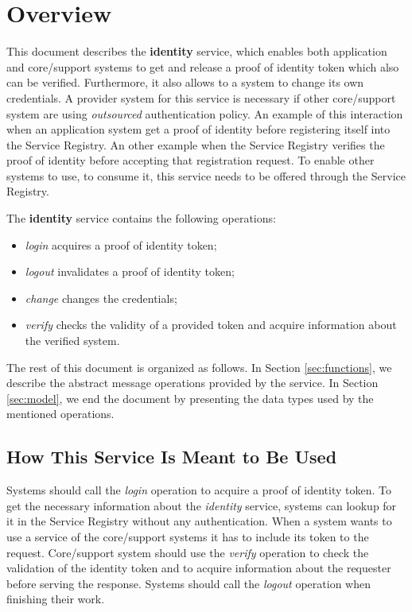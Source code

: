 \documentclass[a4paper]{arrowhead}
\begin{document}
\section{Overview}
\label{sec:overview}
This document describes the \textbf{identity} service, which enables both application and core/support systems to get and release a proof of identity token which also can be verified. Furthermore, it also allows to a system to change its own credentials. A provider system for this service is necessary if other core/support system are using \textit{outsourced} authentication policy. An example of this interaction when an application system get a proof of identity before registering itself into the Service Registry. An other example when the Service Registry verifies the proof of identity before accepting that registration request. To enable other systems to use, to consume it, this service needs to be offered through the Service Registry.

The \textbf{identity} service contains the following operations:

\begin{itemize}
    \item \textit{login} acquires a proof of identity token;
    \item \textit{logout} invalidates a proof of identity token;
    \item \textit{change} changes the credentials;
    \item \textit{verify} checks the validity of a provided token and acquire information about the verified system.
\end{itemize}

The rest of this document is organized as follows.
In Section \ref{sec:functions}, we describe the abstract message operations provided by the service.
In Section \ref{sec:model}, we end the document by presenting the data types used by the mentioned operations.

\subsection{How This Service Is Meant to Be Used}
Systems should call the \textit{login} operation to acquire a proof of identity token. To get the necessary information about the \textit{identity} service, systems can lookup for it in the Service Registry without any authentication. When a system wants to use a service of the core/support systems it has to include its token to the request. Core/support system should use the \textit{verify} operation to check the validation of the identity token and to acquire information about the requester before serving the response. Systems should call the \textit{logout} operation when finishing their work.
\end{document}
